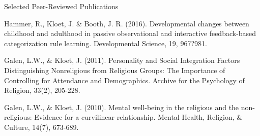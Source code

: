 

\begin{cventries}

  \cventry
    {Selected Peer-Reviewed Publications} %
    {} %
    {} %
      \begin{cvitems} %
        \item {Hammer, R., Kloet, J. \& Booth, J. R. (2016). Developmental changes between childhood and adulthood in passive observational and interactive feedback-based categorization rule learning. Developmental Science, 19, 967?981.}
        \item {Galen, L.W., \& Kloet, J. (2011). Personality and Social Integration Factors Distinguishing Nonreligious from Religious Groups: The Importance of Controlling for Attendance and Demographics. Archive for the Psychology of Religion, 33(2), 205-228.}
        \item {Galen, L.W., & Kloet, J. (2010). Mental well-being in the religious and the non-religious: Evidence for a curvilinear relationship. Mental Health, Religion, & Culture, 14(7), 673-689.}
      \end{cvitems}

\end{cventries}
